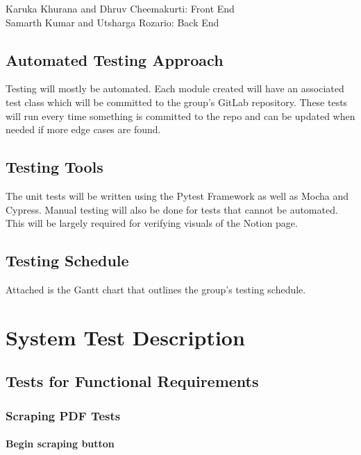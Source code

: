 \documentclass[12pt, titlepage]{article}
\begin{document}
Karuka Khurana and Dhruv Cheemakurti: Front End\\

Samarth Kumar and Utsharga Rozario: Back End\\

\subsection{Automated Testing Approach}
Testing will mostly be automated. Each module created will have an associated test class which will be committed to the group’s GitLab repository. These tests will run every time something is committed to the repo and can be updated when needed if more edge cases are found.  

\subsection{Testing Tools}
The unit tests will be written using the Pytest Framework as well as Mocha and Cypress. Manual testing will also be done for tests that cannot be automated. This will be largely required for verifying visuals of the Notion page. 

\subsection{Testing Schedule}
		
Attached is the Gantt chart that outlines the group’s testing schedule.  

\section{System Test Description}
	
\subsection{Tests for Functional Requirements}

\subsubsection{Scraping PDF Tests}
		
\paragraph{Begin scraping button}
\end{document}
